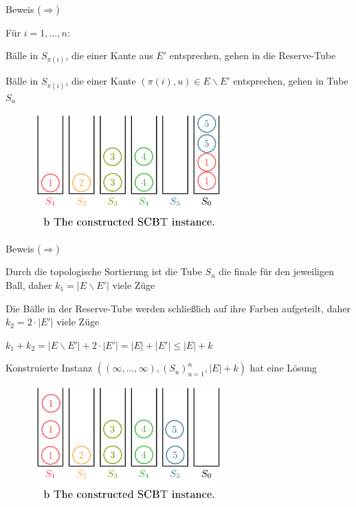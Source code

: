 \documentclass{beamer}
\begin{document}
\begin{frame}{Beweis (\glqq $\Rightarrow$\grqq)}
\begin{pointlist}
\item Für $i=1,\dots,n$:
\begin{arrowlist}
\item Bälle in $S_{\pi(i)}$, die einer Kante aus $E'$ entsprechen, gehen in die Reserve-Tube 
\item Bälle in $S_{\pi(i)}$, die einer Kante $(\pi(i),u)\in E\backslash E'$ entsprechen, gehen in Tube $S_u$
\end{arrowlist}
\end{pointlist}
\begin{figure}
    \centering
    \includegraphics[width=0.65\textwidth]{proofr4}
\end{figure}
\end{frame}

\begin{frame}{Beweis (\glqq $\Rightarrow$\grqq)}
\begin{pointlist}
\item Durch die topologische Sortierung ist die Tube $S_u$ die finale für den jeweiligen Ball, daher $k_1 = |E\backslash E'|$ viele Züge
\item Die Bälle in der Reserve-Tube werden schließlich auf ihre Farben aufgeteilt, daher $k_2 = 2\cdot |E'|$ viele Züge
\item $k_1 + k_2 =  |E\backslash E'| + 2\cdot |E'| = |E| + |E'| \leq |E| + k$
\item Konstruierte Instanz $((\infty, \dots, \infty), (S_u)_{u=1}^n, |E|+k)$ hat eine Lösung
\end{pointlist}
\begin{figure}
    \centering
    \includegraphics[width=0.65\textwidth]{proofr5}
\end{figure}
\end{frame}
\end{document}
